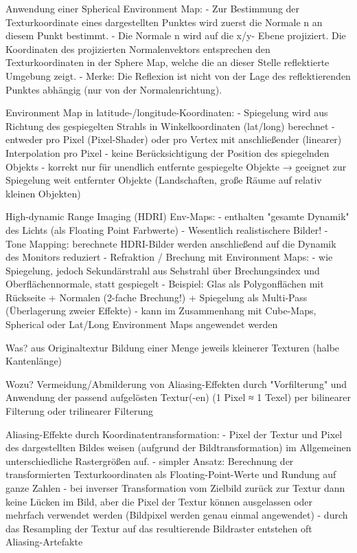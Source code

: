 \documentclass[10pt,landscape]{article}
\makeatletter
\renewcommand{\subsection}{\@startsection{subsection}{2}{0mm}%
                                {-1explus -.5ex minus -.2ex}%
                                {0.5ex plus .2ex}%
                                {\normalfont\normalsize\bfseries}}
\makeatother
\begin{document}
\begin{multicols}{3}
Anwendung einer Spherical Environment Map:
- Zur Bestimmung der Texturkoordinate eines dargestellten Punktes wird zuerst die Normale n an diesem Punkt bestimmt.
- Die Normale n wird auf die x/y- Ebene projiziert. Die Koordinaten des projizierten Normalenvektors entsprechen den Texturkoordinaten in der Sphere Map, welche die an dieser Stelle reflektierte Umgebung zeigt.
- Merke: Die Reflexion ist nicht von der Lage des reflektierenden Punktes abhängig (nur von der Normalenrichtung).

Environment Map in latitude-/longitude-Koordinaten:
- Spiegelung wird aus Richtung des gespiegelten Strahls in Winkelkoordinaten (lat/long) berechnet
- entweder pro Pixel (Pixel-Shader) oder pro Vertex mit anschließender (linearer) Interpolation pro Pixel
- keine Berücksichtigung der Position des spiegelnden Objekts 
- korrekt nur für unendlich entfernte gespiegelte Objekte → geeignet zur Spiegelung weit entfernter Objekte (Landschaften, große Räume auf relativ kleinen Objekten)


High-dynamic Range Imaging (HDRI) Env-Maps:
- enthalten "gesamte Dynamik" des Lichts (als Floating Point Farbwerte)
    - Wesentlich realistischere Bilder!
- Tone Mapping: berechnete HDRI-Bilder werden anschließend auf die Dynamik des Monitors reduziert
- Refraktion / Brechung mit Environment Maps:
  - wie Spiegelung, jedoch Sekundärstrahl aus Sehstrahl über Brechungsindex und Oberflächennormale, statt gespiegelt
  - Beispiel: Glas als Polygonflächen mit Rückseite + Normalen (2-fache Brechung!) + Spiegelung als Multi-Pass (Überlagerung zweier Effekte)
  - kann im Zusammenhang mit Cube-Maps, Spherical oder Lat/Long Environment Maps angewendet werden


Was? aus Originaltextur Bildung einer Menge jeweils kleinerer Texturen (halbe Kantenlänge)

Wozu? Vermeidung/Abmilderung von Aliasing-Effekten durch "Vorfilterung" und Anwendung der passend aufgelösten Textur(-en) (1 Pixel ≈ 1 Texel) per bilinearer Filterung oder trilinearer Filterung

Aliasing-Effekte durch Koordinatentransformation:
- Pixel der Textur und Pixel des dargestellten Bildes weisen (aufgrund der Bildtransformation) im Allgemeinen unterschiedliche Rastergrößen auf.
- simpler Ansatz: Berechnung der transformierten Texturkoordinaten als Floating-Point-Werte und Rundung auf ganze Zahlen
- bei inverser Transformation vom Zielbild zurück zur Textur dann keine Lücken im Bild, aber die Pixel der Textur können ausgelassen oder mehrfach verwendet werden (Bildpixel werden genau einmal angewendet)
- durch das Resampling der Textur auf das resultierende Bildraster entstehen oft Aliasing-Artefakte
  

\end{multicols}
\end{document}

